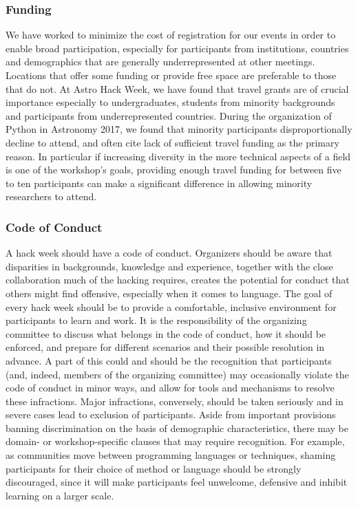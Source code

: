 \documentclass{nature}
\begin{document}
\subsubsection{Funding}

We have worked to minimize the cost of registration for our events in order to enable broad participation, especially for participants from institutions, countries and demographics that are generally underrepresented at other meetings. Locations that offer some funding or provide free space are preferable to those that do not.
At Astro Hack Week, we have found that travel grants are of crucial importance especially to undergraduates, students from minority backgrounds and participants from underrepresented countries. During the organization of Python in Astronomy 2017, we found that minority participants disproportionally decline to attend, and often cite lack of sufficient travel funding as the primary reason. In particular if increasing diversity in the more technical aspects of a field is one of the workshop's goals, providing enough travel funding for between five to ten participants can make a significant difference in allowing minority researchers to attend.

\subsubsection{Code of Conduct}

A hack week should have a code of conduct. Organizers should be aware that disparities in backgrounds, knowledge and experience, together with the close collaboration much of the hacking requires, creates the potential for conduct that others might find offensive, especially when it comes to language. The goal of every hack week should be to provide a comfortable, inclusive environment for participants to learn and work. It is the responsibility of the organizing committee to discuss what belongs in the code of conduct, how it should be enforced, and prepare for different scenarios and their possible resolution in advance.
A part of this could and should be the recognition that participants (and, indeed, members of the organizing committee) may occasionally violate the code of conduct in minor ways, and allow for tools and mechanisms to resolve these infractions. Major infractions, conversely, should be taken seriously and in severe cases lead to exclusion of participants.
Aside from important provisions banning discrimination on the basis of demographic characteristics, there may be domain- or workshop-specific clauses that may require recognition. For example, as communities move between programming languages or techniques, shaming participants for their choice of method or language should be strongly discouraged, since it will make participants feel unwelcome, defensive and inhibit learning on a larger scale.
\end{document}
